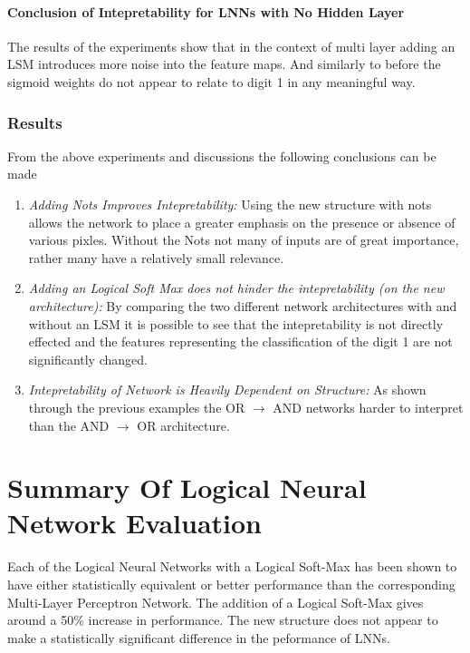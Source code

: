 \paragraph{Conclusion of Intepretability for LNNs with No Hidden Layer}
The results of the experiments show that in the context of multi layer adding an LSM introduces more noise into the feature maps. And similarly to before the sigmoid weights do not appear to relate to digit 1 in any meaningful way.

\subsubsection{Results}
From the above experiments and discussions the following conclusions can be made

\begin{enumerate}
	\item \textit{Adding Nots Improves Intepretability:} Using the new structure with nots allows the network to place a greater emphasis on the presence or absence of various pixles. Without the Nots not many of inputs are of great importance, rather many have a relatively small relevance.
	\item \textit{Adding an Logical Soft Max does not hinder the intepretability (on the new architecture):} By comparing the two different network architectures with and without an LSM it is possible to see that the intepretability is not directly effected and the features representing the classification of the digit 1 are not significantly changed.
	\item \textit{Intepretability of Network is Heavily Dependent on Structure:} As shown through the previous examples the OR $\rightarrow$ AND networks harder to interpret than the AND $\rightarrow$ OR architecture.
\end{enumerate}

\section{Summary Of Logical Neural Network Evaluation}
Each of the Logical Neural Networks with a Logical Soft-Max has been shown to have either statistically equivalent or better performance than the corresponding Multi-Layer Perceptron Network. The addition of a Logical Soft-Max gives around a 50\% increase in performance. The new structure does not appear to make a statistically significant difference in the peformance of LNNs.\\

